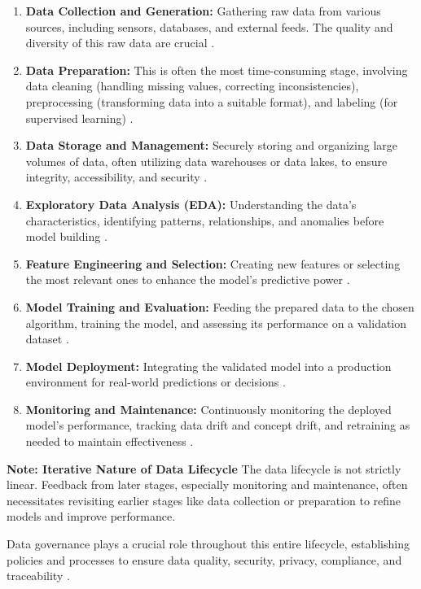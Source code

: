 \begin{enumerate}
    \item \textbf{Data Collection and Generation:} Gathering raw data from various sources, including sensors, databases, and external feeds. The quality and diversity of this raw data are crucial \parencite{DataCamp2023}.
    \item \textbf{Data Preparation:} This is often the most time-consuming stage, involving data cleaning (handling missing values, correcting inconsistencies), preprocessing (transforming data into a suitable format), and labeling (for supervised learning) \parencite{DataCamp2023}.
    \item \textbf{Data Storage and Management:} Securely storing and organizing large volumes of data, often utilizing data warehouses or data lakes, to ensure integrity, accessibility, and security \parencite{Komprise2023}.
    \item \textbf{Exploratory Data Analysis (EDA):} Understanding the data's characteristics, identifying patterns, relationships, and anomalies before model building \parencite{GeeksforGeeks2023}.
    \item \textbf{Feature Engineering and Selection:} Creating new features or selecting the most relevant ones to enhance the model's predictive power \parencite{GeeksforGeeks2023}.
    \item \textbf{Model Training and Evaluation:} Feeding the prepared data to the chosen algorithm, training the model, and assessing its performance on a validation dataset \parencite{DataCamp2023}.
    \item \textbf{Model Deployment:} Integrating the validated model into a production environment for real-world predictions or decisions \parencite{DataCamp2023}.
    \item \textbf{Monitoring and Maintenance:} Continuously monitoring the deployed model's performance, tracking data drift and concept drift, and retraining as needed to maintain effectiveness \parencite{Milvus2023}.
\end{enumerate}
\begin{notebox}
    \textbf{Note: Iterative Nature of Data Lifecycle}
    The data lifecycle is not strictly linear. Feedback from later stages, especially monitoring and maintenance, often necessitates revisiting earlier stages like data collection or preparation to refine models and improve performance.
\end{notebox}
Data governance plays a crucial role throughout this entire lifecycle, establishing policies and processes to ensure data quality, security, privacy, compliance, and traceability \parencite{IBM2023DataGovernance}.

